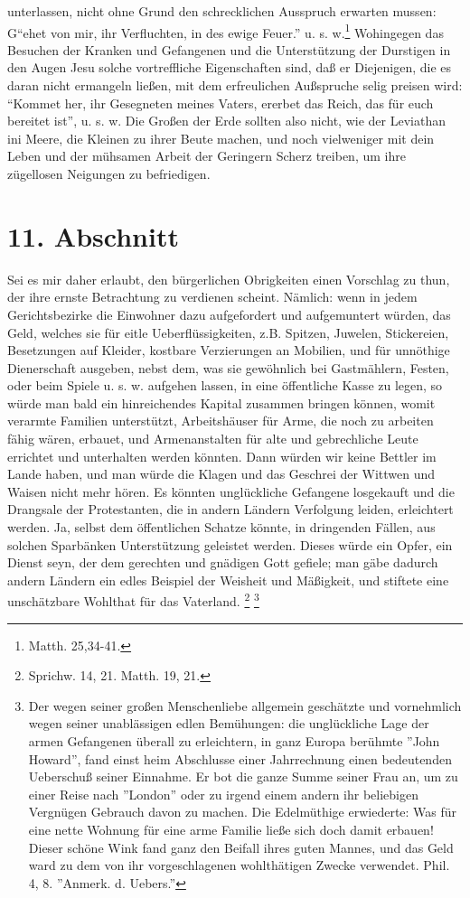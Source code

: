 unterlassen, nicht ohne Grund den schrecklichen Ausspruch erwarten mussen:
G"`ehet von mir, ihr Verfluchten, in des ewige Feuer."' u. s. w.\footnote{Matth.
25,34-41.} Wohingegen das Besuchen der Kranken und Gefangenen und die
Unterstützung der Durstigen in den Augen Jesu solche vortreffliche Eigenschaften
sind, daß er Diejenigen, die es daran nicht ermangeln ließen, mit dem
erfreulichen Außspruche selig preisen wird: "`Kommet her, ihr Gesegneten meines
Vaters, ererbet das Reich, das für euch bereitet ist"', u. s. w. Die Großen der
Erde sollten also nicht, wie der Leviathan ini Meere, die Kleinen zu ihrer Beute
machen, und noch vielweniger mit dein Leben und der mühsamen Arbeit der
Geringern Scherz treiben, um ihre zügellosen Neigungen zu befriedigen.

\section{11. Abschnitt} \label{kap18_ab11}

Sei es mir daher erlaubt, den bürgerlichen Obrigkeiten einen Vorschlag zu thun,
der ihre ernste Betrachtung zu verdienen scheint. Nämlich: wenn in jedem
Gerichtsbezirke die Einwohner dazu aufgefordert und aufgemuntert würden, das
Geld, welches sie für eitle Ueberflüssigkeiten, z.B. Spitzen, Juwelen,
Stickereien, Besetzungen auf Kleider, kostbare Verzierungen an Mobilien, und für
unnöthige Dienerschaft ausgeben, nebst dem, was sie gewöhnlich bei Gastmählern,
Festen, oder beim Spiele u. s. w. aufgehen lassen, in eine öffentliche Kasse zu
legen, so würde man bald ein hinreichendes Kapital zusammen bringen können,
womit verarmte Familien unterstützt, Arbeitshäuser für Arme, die noch zu
arbeiten fähig wären, erbauet, und Armenanstalten für alte und gebrechliche
Leute errichtet und unterhalten werden könnten. Dann
würden wir keine Bettler im Lande haben, und man würde die Klagen und das
Geschrei der Wittwen und Waisen nicht mehr hören. Es könnten unglückliche
Gefangene losgekauft und die Drangsale der Protestanten, die in andern Ländern
Verfolgung leiden, erleichtert werden. Ja,
selbst dem öffentlichen Schatze könnte, in dringenden Fällen, aus solchen
Sparbänken Unterstützung geleistet werden. Dieses würde ein Opfer, ein Dienst
seyn, der dem gerechten und gnädigen Gott gefiele; man gäbe dadurch andern
Ländern ein edles Beispiel der Weisheit und Mäßigkeit, und stiftete eine
unschätzbare Wohlthat für das Vaterland.
\footnote{Sprichw. 14, 21. Matth. 19, 21.} \footnote{Der wegen seiner großen
Menschenliebe allgemein geschätzte und vornehmlich wegen seiner unablässigen
edlen Bemühungen: die unglückliche Lage der armen Gefangenen überall zu
erleichtern, in ganz Europa berühmte ''John Howard'', fand einst heim Abschlusse
einer Jahrrechnung einen bedeutenden Ueberschuß seiner Einnahme. Er bot die
ganze Summe seiner Frau an, um zu einer Reise nach ''London'' oder zu irgend
einem andern ihr beliebigen Vergnügen Gebrauch davon zu machen. Die Edelmüthige
erwiederte: Was für eine nette Wohnung für eine arme Familie ließe sich doch
damit erbauen! Dieser schöne Wink fand ganz den Beifall
ihres guten Mannes, und das Geld ward zu dem von ihr vorgeschlagenen
wohlthätigen Zwecke verwendet. Phil. 4, 8.
''Anmerk. d. Uebers.''}

